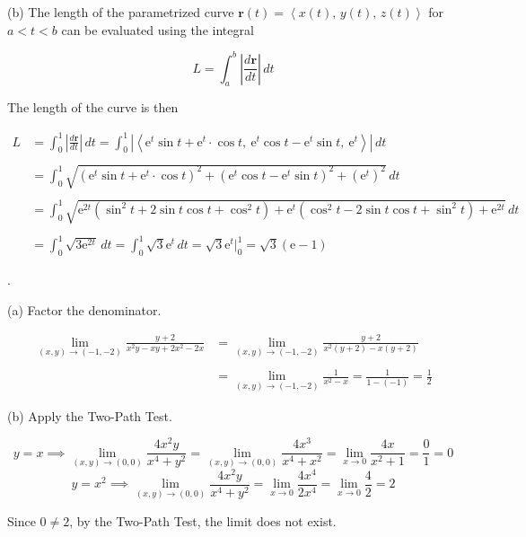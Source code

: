 \documentclass{article}
\begin{document}
\hfill

\noindent (b) The length of the parametrized curve $\mathbf{r}(t)=\left\langle x(t),\,y(t),\,z(t)\right\rangle$ for $a<t<b$ can be evaluated using the integral

\[L=\int_a^b\left|\frac{d\mathbf r}{dt}\right|\,dt\]

\hfill

\noindent The length of the curve is then

\begin{align*}L&=\int_0^1\left|\frac{d\mathbf r}{dt}\right|\,dt=\int_0^1\left|\left\langle\mathrm{e}^t\sin t+\mathrm{e}^t\cdot\cos t,\:\mathrm{e}^t\cos t-\mathrm{e}^t\sin t,\:\mathrm{e}^t\right\rangle\right|\,dt\\\\&=\int_0^1\sqrt{\left(\mathrm{e}^t\sin t+\mathrm{e}^t\cdot\cos t\right)^2+\left(\mathrm{e}^t\cos t-\mathrm{e}^t\sin t\right)^2+\left(\mathrm{e}^t\right)^2}\,dt\\\\&=\int_0^1\sqrt{\mathrm{e}^{2t}\left(\sin^2t+2\sin t\cos t+\cos^2t\right)+\mathrm{e}^t\left(\cos^2t-2\sin t\cos t+\sin^2t\right)+\mathrm{e}^{2t}}\,dt\\\\&=\int_0^1\sqrt{3\mathrm{e}^{2t}}\,dt=\int_0^1\sqrt3\mathrm e^t\,dt=\sqrt3\mathrm{e}^t\bigg|_0^1=\boxed{\sqrt3(\mathrm e-1)}\end{align*}

\hfill

.

\hfill

\noindent (a) Factor the denominator.

\begin{align*}\lim_{(x,y)\to(-1,-2)}\frac{y+2}{x^2y-xy+2x^2-2x}&=\lim_{(x,y)\to(-1,-2)}\frac{y+2}{x^2(y+2)-x(y+2)}\\\\&=\lim_{(x,y)\to(-1,-2)}\frac1{x^2-x}=\frac1{1-(-1)}=\boxed{\frac12}\end{align*}

\hfill

\noindent (b) Apply the Two-Path Test.

\[y=x\implies\lim_{(x,y)\to(0,0)}\frac{4x^2y}{x^4+y^2}=\lim_{(x,y)\to(0,0)}\frac{4x^3}{x^4+x^2}=\lim_{x\to0}\frac{4x}{x^2+1}=\frac01=0\]
\[y=x^2\implies\lim_{(x,y)\to(0,0)}\frac{4x^2y}{x^4+y^2}=\lim_{x\to0}\frac{4x^4}{2x^4}=\lim_{x\to0}\frac42=2\]

\hfill

\noindent Since $0\neq2$, by the Two-Path Test, the limit does not exist.
\end{document}
